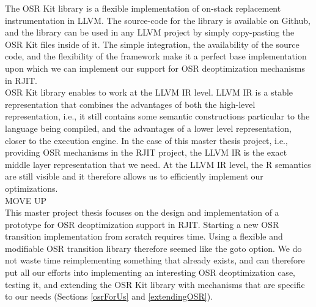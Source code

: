 The OSR Kit library\cite{OSRKit} is a flexible implementation of on-stack replacement instrumentation in LLVM.
The source-code for the library is available on Github\cite{OSRKitGit}, and the library can be used in any LLVM project by simply copy-pasting the OSR Kit files inside of it.
The simple integration, the availability of the source code, and the flexibility of the framework make it a perfect base implementation upon which we can implement our support for OSR deoptimization mechanisms in RJIT.\\

OSR Kit library enables to work at the LLVM IR level.
LLVM IR is a stable representation that combines the advantages of both the high-level representation, i.e., it still contains some semantic constructions particular to the language being compiled, and the advantages of a lower level representation, closer to the execution engine.
In the case of this master thesis project, i.e., providing OSR mechanisms in the RJIT project, the LLVM IR is the exact middle layer representation that we need. 
At the LLVM IR level, the R semantics are still visible and it therefore allows us to efficiently implement our optimizations.\\

MOVE UP\\

This master project thesis focuses on the design and implementation of a prototype for OSR deoptimization support in RJIT.
Starting a new OSR transition implementation from scratch requires time.
Using a flexible and modifiable OSR transition library therefore seemed like the goto option.
We do not waste time reimplementing something that already exists, and can therefore put all our efforts into implementing an interesting OSR deoptimization case, testing it, and extending the OSR Kit library with mechanisms that are specific to our needs (Sections \ref{osrForUs} and \ref{extendingOSR}).\\

